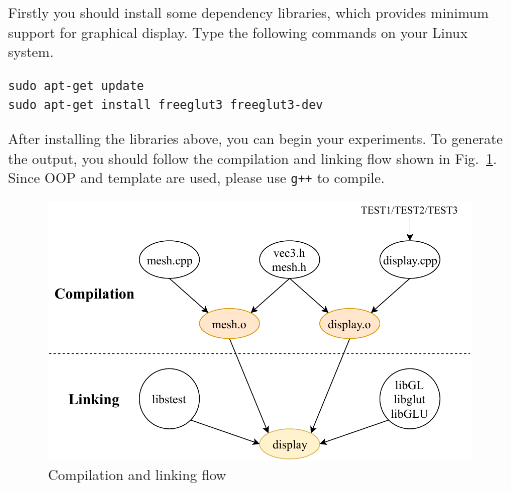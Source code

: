 \documentclass[english]{../TexTemplate/thesis}
\begin{document}
Firstly you should install some dependency libraries, which provides minimum support for graphical display.
Type the following commands on your Linux system.
\begin{lstlisting}
sudo apt-get update
sudo apt-get install freeglut3 freeglut3-dev
\end{lstlisting}

After installing the libraries above, you can begin your experiments.
To generate the output, you should follow the compilation and linking flow shown in Fig.~\ref{fig:autobuild}.
Since OOP and template are used, please use \verb'g++' to compile.
\begin{figure}[H]
\centering
\includegraphics[width=0.8\linewidth]{fig/assignments/autobuild.pdf}
\caption{Compilation and linking flow}
\label{fig:autobuild}
\end{figure}
\end{document}
